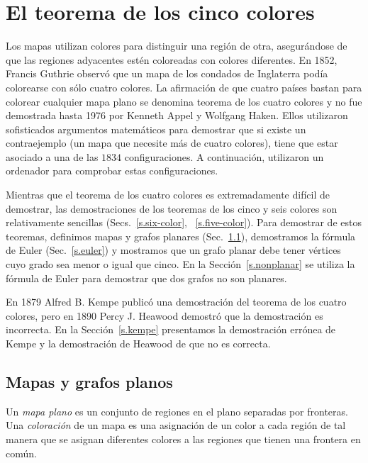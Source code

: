
\chapter{El teorema de los cinco colores}\label{c.five}


Los mapas utilizan colores para distinguir una región de otra, asegurándose de que las regiones adyacentes estén coloreadas con colores diferentes. En 1852, Francis Guthrie observó que un mapa de los condados de Inglaterra podía colorearse con sólo cuatro colores. La afirmación de que cuatro países bastan para colorear cualquier mapa plano se denomina teorema de los cuatro colores y no fue demostrada hasta 1976 por Kenneth Appel y Wolfgang Haken. Ellos utilizaron sofisticados argumentos matemáticos para demostrar que si existe un contraejemplo (un mapa que necesite más de cuatro colores), tiene que estar asociado a una de las $1834$ configuraciones. A continuación, utilizaron un ordenador para comprobar estas configuraciones.

Mientras que el teorema de los cuatro colores es extremadamente difícil de demostrar, las demostraciones de los teoremas de los cinco y seis colores son relativamente sencillas (Secs.~\ref{s.six-color}, ~\ref{s.five-color}). Para demostrar de estos teoremas, definimos mapas y grafos planares (Sec.~\ref{s.planar}), demostramos la fórmula de Euler (Sec.~\ref{s.euler}) y mostramos que un grafo planar debe tener vértices cuyo grado sea menor o igual que cinco. En la Sección~\ref{s.nonplanar} se utiliza la fórmula de Euler para demostrar que dos grafos no son planares.

En 1879 Alfred B. Kempe publicó una demostración del teorema de los cuatro colores, pero en 1890 Percy J. Heawood demostró que la demostración es incorrecta. En la Sección~\ref{s.kempe} presentamos la demostración errónea de Kempe y la demostración de Heawood de que no es correcta.


\section{Mapas y grafos planos}\label{s.planar}

\begin{definition}
Un \textit{mapa plano} es un conjunto de regiones en el plano separadas por fronteras. Una \textit{coloración} de un mapa es una asignación de un color a cada región de tal manera que se asignan diferentes colores a las regiones que tienen una frontera en común.
\end{definition}

